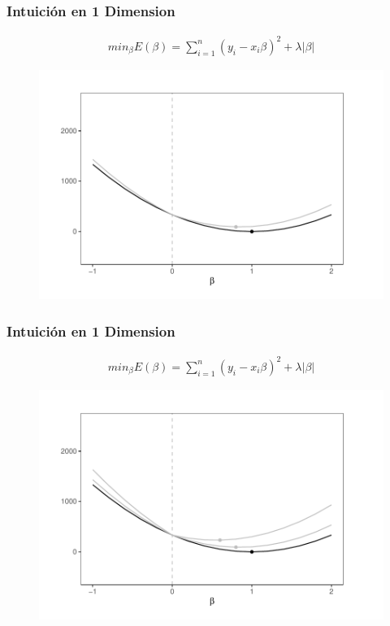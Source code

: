 \documentclass[
  shownotes,
  xcolor={svgnames},
  hyperref={colorlinks,citecolor=DarkBlue,linkcolor=DarkRed,urlcolor=DarkBlue}
  , aspectratio=169]{beamer}
\begin{document}
\begin{frame}[fragile]
\frametitle{Intuición en 1 Dimension}

\begin{align}
 min_{\beta} E(\beta) = \sum_{i=1}^n (y_i-x_i \beta)^2 + \lambda|\beta| 
\end{align}
   \begin{figure}[H] \centering
            \captionsetup{justification=centering}
              \includegraphics[scale=0.6]{figures/lasso2.pdf}
 \end{figure}




\end{frame}
\begin{frame}[fragile]
\frametitle{Intuición en 1 Dimension}

\begin{align}
 min_{\beta} E(\beta) = \sum_{i=1}^n (y_i-x_i \beta)^2 + \lambda|\beta| 
\end{align}

   \begin{figure}[H] \centering
            \captionsetup{justification=centering}
              \includegraphics[scale=0.6]{figures/lasso3.pdf}
 \end{figure}




\end{frame}
\end{document}
